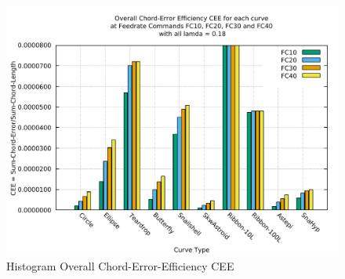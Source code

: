 \clearpage
\pagebreak
\begin{landscape}
	
\begin{figure}
\centering
\caption  {Histogram Overall Chord-Error-Efficiency CEE}
\label{img-Histogram Overall Chord-Error-Efficiency CEE}
\includegraphics[width=1.35\textwidth]{Chap4/Overall/Histogram/CEE-img-Histo-Overall-Chord-Error-Efficiency.pdf} 
\end{figure}
	
\end{landscape}

